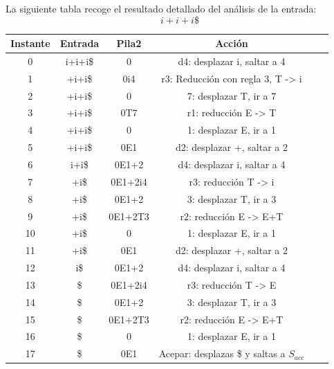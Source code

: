 \documentclass{apuntes}
\begin{document}
\begin{example}
La siguiente tabla recoge el resultado detallado del análisis de la entrada:
\[i+i+i\$\]
\begin{tabular}{| c | c | c | c | c | c |}
\hline
Instante & Entrada &  Pila2 & Acción \\
\hline
0 & i+i+i\$ & 0 & d4: desplazar i, saltar a 4\\
\hline
1 & +i+i\$ & 0i4 & r3: Reducción con regla 3, T -> i \\
\hline
2 & +i+i\$ & 0& 7: desplazar T, ir a 7 \\
\hline
3 & +i+i\$ & 0T7 & r1: reducción E -> T\\
\hline
4  & +i+i\$ & 0 & 1: desplazar E, ir a 1 \\
\hline
5 & +i+i\$  & 0E1 & d2: desplazar +, saltar a 2\\
\hline
6 & i+i\$  & 0E1+2 & d4: desplazar i, saltar a 4\\
\hline
7 & +i\$ & 0E1+2i4 & r3: reducción T -> i \\
\hline
8 & +i\$ & 0E1+2 & 3: desplazar T, ir a 3 \\
\hline
9 & +i\$ & 0E1+2T3 & r2: reducción E -> E+T \\
\hline
10 & +i\$ & 0 & 1: desplazar E, ir a 1 \\
\hline
11 & +i\$ & 0E1 & d2: desplazar +, saltar a 2 \\
\hline
12 & i\$ & 0E1+2 & d4: desplazar i, saltar a 4 \\
\hline
13 & \$ & 0E1+2i4 & r3: reducción T -> E\\
\hline
14 & \$ & 0E1+2 & 3: desplazar T, ir a 3 \\
\hline
15 & \$ & 0E1+2T3 & r2: reducción E -> E+T \\
\hline
16 & \$ & 0 & 1: desplazar E, ir a 1 \\
\hline
17 & \$ & 0E1 & Acepar: desplazas \$ y saltas a $S_{acc}$ \\
\hline
\end{tabular}
\end{example}
\end{document}
